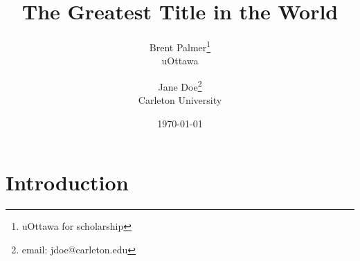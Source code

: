 \documentclass[12pt, twocolumn]{article}
\title{The Greatest Title in the World}
\author{Brent Palmer\thanks{uOttawa for scholarship}\\uOttawa \and Jane Doe\thanks{email: jdoe@carleton.edu}\\Carleton University}
\date{\today}
\begin{document}
\maketitle %



\begin{abstract}
	\lipsum[7]
\end{abstract}

\section{Introduction}

\lipsum[1-6]
\end{document}

